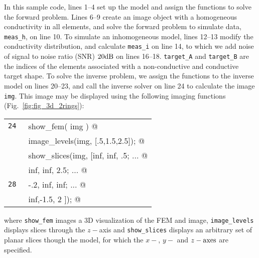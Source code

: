 \documentclass[12pt]{iopart}
\makeatletter
\newcommand{\CODEstart}{\medskip\begin{tabular}{ll}}
\newcommand{\CN}{\tt\scriptsize} %
\newcommand{\CC}{&\small\verb@}   % start code
\newcommand{\CODEend}{\end{tabular}\medskip}
\makeatother
\begin{document}
%
% FIGURE: 2 rings electrode config
%
\begin{figure}[th]
\end{figure}

In this sample code, lines 1--4 set up the model and assign
the functions to solve the forward problem.
Lines 6--9 create an image object with a homogeneous
conductivity in all elements, and solve the forward
problem to simulate data, {\tt meas\_h}, on line 10. To simulate an
inhomogeneous model, lines 12--13 modify the conductivity
distribution, and calculate {\tt meas\_i} on line 14,
to which we add noise of signal to noise ratio (SNR) $20\rm dB$
on lines 16--18.
{\tt target\_A} and {\tt target\_B} are the indices of the 
elements associated with a non-conductive and conductive
target shape.
To solve the inverse problem, we assign the functions to
the inverse model on lines 20--23, and call the inverse solver
on line 24 to calculate the image {\tt img}. This image
may be displayed using the following imaging functions
(Fig.~\ref{fig:fig_3d_2rings}):

\CODEstart
\CN 24 \CC show_fem( img ) @\\[-3pt]
\CN    \CC image_levels(img, [.5,1.5,2.5]); @\\[-3pt]
\CN    \CC show_slices(img, [inf, inf, .5; ... @\\[-3pt]
\CN    \CC                   inf, inf, 2.5; ... @\\[-3pt]
\CN 28 \CC                   -.2, inf, inf; ... @\\[-3pt]
\CN    \CC                   inf,-1.5,   2 ]); @\\[-3pt]
\CODEend

\noindent
where {\tt show\_fem} images a 3D visualization of the
FEM and image, {\tt image\_levels} displays slices through
the $z-$axis and {\tt show\_slices} displays an
arbitrary set of planar slices though the model, for which the
$x-$, $y-$ and $z-\rm axes$ are specified.
\end{document}

